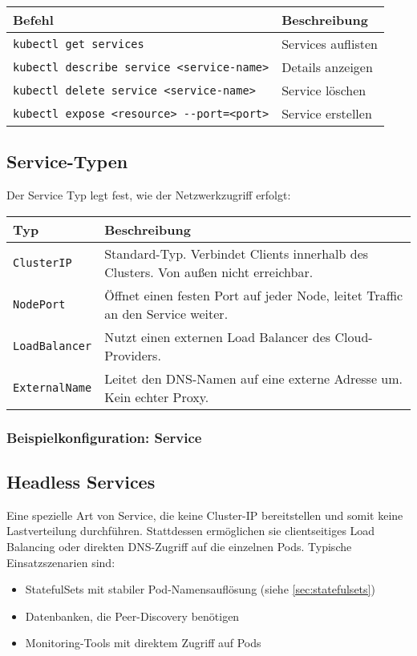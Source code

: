 \noindent
\begin{tabular}{|p{}|p{}|}
\hline
\textbf{Befehl} & \textbf{Beschreibung} \\
\hline
\texttt{kubectl get services} & Services auflisten \\
\texttt{kubectl describe service <service-name>} & Details anzeigen \\
\texttt{kubectl delete service <service-name>} & Service löschen \\
\texttt{kubectl expose <resource> {-}{-}port=<port>} & Service erstellen\\
\hline
\end{tabular}

\subsection{Service-Typen}
Der Service Typ legt fest, wie der Netzwerkzugriff erfolgt:\\
\begin{tabular}{|p{}|p{}|}
\hline
\textbf{Typ} & \textbf{Beschreibung} \\
\hline
\texttt{ClusterIP} & Standard-Typ. Verbindet Clients innerhalb des Clusters. Von außen nicht erreichbar. \\
\texttt{NodePort} & Öffnet einen festen Port auf jeder Node, leitet Traffic an den Service weiter. \\
\texttt{LoadBalancer} & Nutzt einen externen Load Balancer des Cloud-Providers. \\
\texttt{ExternalName} & Leitet den DNS-Namen auf eine externe Adresse um. Kein echter Proxy. \\
\hline
\end{tabular}

\subsubsection{Beispielkonfiguration: Service}


\subsection{Headless Services}
\label{subsec:headless-service}
Eine spezielle Art von Service, die keine Cluster-IP bereitstellen und somit keine Lastverteilung durchführen. Stattdessen ermöglichen sie clientseitiges Load Balancing oder direkten DNS-Zugriff auf die einzelnen Pods.
Typische Einsatzszenarien sind:
\begin{itemize}
    \item StatefulSets mit stabiler Pod-Namensauflösung (siehe \ref{sec:statefulsets})
    \item Datenbanken, die Peer-Discovery benötigen
    \item Monitoring-Tools mit direktem Zugriff auf Pods
\end{itemize}
